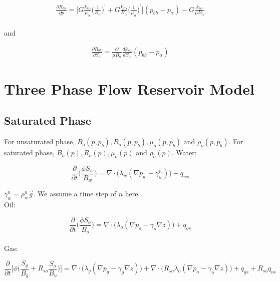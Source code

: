 \documentclass[12pt]{article}
\begin{document}
\begin{equation}
\begin{split}
\frac{\partial R_{bh}}{\partial p} = \Big[G \frac{k_{r\alpha}}{\mu_\alpha}\big( \frac{1}{B_\alpha}\big)^\prime+G \frac{k_{r\alpha}}{B_\alpha}\big( \frac{1}{\mu_\alpha}\big)^\prime\Big](p_{bh}-p_{\alpha})-G \frac{k_{r\alpha}}{\mu B_{\alpha}}\\
\end{split}
\end{equation}

and

\begin{equation}
\begin{split}
\frac{\partial R_{bh}}{\partial S_w} = \frac{G}{\mu B_\alpha} \frac{ dk_{r\alpha}}{dS_w}(p_{bh}-p_{\alpha}) 
\end{split}
\end{equation}





\section{Three Phase Flow Reservoir Model}
\subsection{Saturated Phase}

For unsaturated phase, $B_o(p,p_b), R_o(p,p_b), \mu_o(p,p_b) \text{ and } \rho_o(p,p_b)$. For saturated phase, $B_o(p), R_o(p), \mu_o(p) \text{ and } \rho_o(p)$.
\newline
Water:

\begin{equation}
\frac{\partial}{\partial t}\Big(\frac{\phi S_w}{B_w}\Big) = \nabla\cdot\Big(\lambda_w(\nabla p_w-\gamma_w^n)\Big)+q_{ws}
\end{equation}

$\gamma^n_w = \rho_w^n\vec{g}$. We assume a time step of $n$ here.
\\
Oil:

\begin{equation}
\frac{\partial}{\partial t}\Big(\frac{\phi S_o}{B_o}\Big) = \nabla\cdot\Big(\lambda_o(\nabla p_o-\gamma_o\nabla z)\Big)+q_{os}
\end{equation}
\\
Gas:

\begin{equation}
\frac{\partial}{\partial t}\Big[\phi\Big(\frac{ S_g}{B_g}+R_{so}\frac{ S_o}{B_o}\Big)\Big] =  \nabla\cdot\Big(\lambda_g(\nabla p_g-\gamma_g\nabla z)\Big)+\nabla\cdot\Big(R_{so}\lambda_o(\nabla p_o-\gamma_o\nabla z)\Big)+q_{gs}+R_{so}q_{os}
\end{equation}
\end{document}
